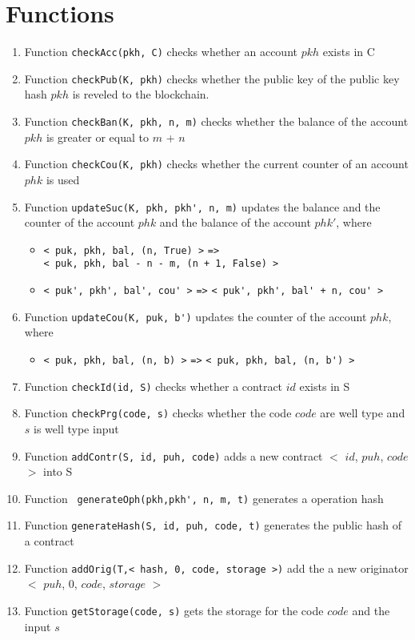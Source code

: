 \documentclass[a4paper]{llncs}
\begin{document}
\section{Functions}
\begin{enumerate}
    \item Function \verb!checkAcc(pkh, C)! checks whether an account $pkh$ exists in C
    \item Function \verb!checkPub(K, pkh)! checks whether the public key of the public key hash $pkh$ is reveled to the blockchain.
    \item Function \verb!checkBan(K, pkh, n, m)! checks whether the balance of the account $pkh$ is greater or equal to $m$ + $n$
    \item Function \verb!checkCou(K, pkh)! checks whether the current counter of an account $phk$ is used
    \item Function \verb!updateSuc(K, pkh, pkh', n, m)! updates the balance and the counter of the account $phk$ and the balance of the account $phk'$, where
    \begin{itemize}
        \item  \verb!< puk, pkh, bal, (n, True) >!  \verb!=>! \\ \verb!< puk, pkh, bal - n - m, (n + 1, False) >!
        \item  \verb!< puk', pkh', bal', cou' >! \verb!=>! \verb!< puk', pkh', bal' + n, cou' >!
    \end{itemize}
    
    \item Function \verb!updateCou(K, puk, b')! updates the counter of the account $phk$, where
    \begin{itemize}
        \item  \verb!< puk, pkh, bal, (n, b) >!  \verb!=>! \verb!< puk, pkh, bal, (n, b') >!
    \end{itemize}
    
    \item Function \verb!checkId(id, S)! checks whether a contract $id$ exists in S
    
    \item Function \verb!checkPrg(code, s)! checks whether the code $code$ are well type and $s$ is well type input 
    
    \item Function \verb!addContr(S, id, puh, code)! adds a new  contract $<$ $id$, $puh$, $code$ $>$  into S
    
    \item Function \verb! generateOph(pkh,pkh', n, m, t)! generates a operation hash

    \item Function \verb!generateHash(S, id, puh, code, t)! generates the public hash of a contract 
     
    \item Function \verb!addOrig(T,< hash, 0, code, storage >)! add the a new originator $<$ $puh$, 0, $code$, $storage$ $>$ 
    \item Function \verb!getStorage(code, s)! gets the storage for the code $code$ and the input $s$
\end{enumerate}
\end{document}

